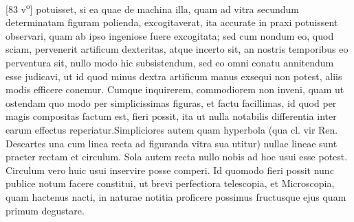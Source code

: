 [83 v\textsuperscript{o}] potuisset, si ea quae de machina illa, quam ad vitra secundum determinatam figuram polienda, excogitaverat, ita accurate in praxi potuissent observari, quam ab ipso ingeniose fuere excogitata; sed cum nondum eo, quod sciam, pervenerit artificum dexteritas, atque incerto sit, an nostris temporibus eo perventura sit, nullo modo hic subsistendum, sed eo omni conatu annitendum esse judicavi, ut id quod minus dextra artificum manus exsequi non potest, aliis modis efficere conemur. Cumque inquirerem, commodiorem non inveni, quam ut ostendam quo modo per simplicissimas figuras, et factu facillimas, id quod per magis compositas factum est, fieri possit, ita ut nulla notabilis differentia inter earum effectus reperiatur.\pend \pstart Simpliciores autem quam hyperbola (qua cl. vir Ren. Descartes\protect{} una cum linea recta ad figuranda vitra sua utitur) nullae lineae sunt praeter rectam et circulum. Sola autem recta nullo nobis ad hoc usui esse potest. Circulum vero huic usui inservire posse comperi. Id quomodo fieri possit nunc publice notum facere constitui, ut brevi perfectiora telescopia\protect{}, et Microscopia\protect{}, quam hactenus nacti, in naturae notitia proficere possimus fructusque ejus quam primum degustare. 